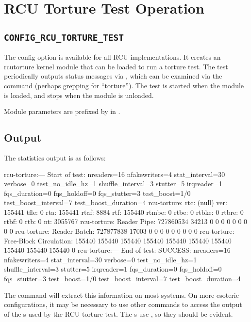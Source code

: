 
\section{RCU Torture Test Operation}
\label{sec:rcu:RCU Torture Test Operation}


\subsection{\texttt{CONFIG\_RCU\_TORTURE\_TEST}}

The  config option is available for all RCU
implementations.
It creates an rcutorture kernel module that can
be loaded to run a torture test.
The test periodically outputs
status messages via , which can be examined via the 
command (perhaps grepping for ``torture'').
The test is started
when the module is loaded, and stops when the module is unloaded.

Module parameters are prefixed by  in
.

\subsection{Output}

The statistics output is as follows:

\begin{VerbatimU}[breaklines=true]
	rcu-torture:--- Start of test: nreaders=16 nfakewriters=4 stat_interval=30 verbose=0 test_no_idle_hz=1 shuffle_interval=3 stutter=5 irqreader=1 fqs_duration=0 fqs_holdoff=0 fqs_stutter=3 test_boost=1/0 test_boost_interval=7 test_boost_duration=4
	rcu-torture: rtc:           (null) ver: 155441 tfle: 0 rta: 155441 rtaf: 8884 rtf: 155440 rtmbe: 0 rtbe: 0 rtbke: 0 rtbre: 0 rtbf: 0 rtb: 0 nt: 3055767
	rcu-torture: Reader Pipe:  727860534 34213 0 0 0 0 0 0 0 0 0
	rcu-torture: Reader Batch:  727877838 17003 0 0 0 0 0 0 0 0 0
	rcu-torture: Free-Block Circulation:  155440 155440 155440 155440 155440 155440 155440 155440 155440 155440 0
	rcu-torture:--- End of test: SUCCESS: nreaders=16 nfakewriters=4 stat_interval=30 verbose=0 test_no_idle_hz=1 shuffle_interval=3 stutter=5 irqreader=1 fqs_duration=0 fqs_holdoff=0 fqs_stutter=3 test_boost=1/0 test_boost_interval=7 test_boost_duration=4
\end{VerbatimU}

The command  will extract this information on
most systems.
On more esoteric configurations, it may be necessary to
use other commands to access the output of the s used by
the RCU torture test.
The s use , so they should
be evident.%

